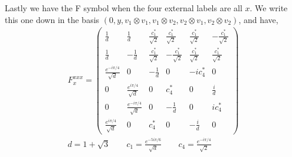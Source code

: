 \documentclass[12pt,a4paper]{article}
\newcommand{\tp}{\otimes}
\begin{document}
Lastly we have the F symbol when the four external labels are all $x$.
We write this one down in the basis $(0,y, v_1\tp v_1,v_1 \tp v_2, v_2 \tp v_1, v_2 \tp v_2)$, and have,
\begin{align}
F^{xxx}_x  = 
 \left(\begin{matrix}
\frac{1}{d} & \frac{1}{d} & \frac{c_1^*}{\sqrt{2}} & \frac{c_1^*}{\sqrt{2}} & \frac{c_1^*}{\sqrt{2}} & - \frac{c_1^*}{\sqrt{2}} \\
\frac{1}{d} & - \frac{1}{d} & \frac{c_1^*}{\sqrt{2}} & -\frac{c_1^*}{\sqrt{2}} & \frac{c_1^*}{\sqrt{2}} & \frac{c_1^*}{\sqrt{2}} \\
\frac{e^{- i \pi/4}}{\sqrt{d}} & 0 & -\frac{1}{d} & 0 & -i c_4^* & 0 \\
0 & \frac{e^{i \pi /4}}{\sqrt{d}} & 0 &c_4^* & 0 & \frac{ i}{d} \\
0 & \frac{e^{- i \pi /4}}{\sqrt{d}} & 0 & -\frac{1}{d} & 0 & i c_4^* \\ 
\frac{e^{i \pi /4}}{\sqrt{d}} & 0 & c_4^* & 0 & - \frac{i}{d} & 0
\end{matrix} \right) \\
d = 1 + \sqrt{3} \quad \quad c_1 = \frac{e^{-5 i \pi/6} }{\sqrt{d}} \quad \quad c_4 = \frac{e^{-i \pi/4}}{\sqrt{2}}
\end{align}


\end{document}
